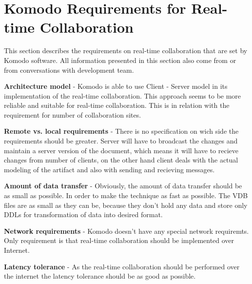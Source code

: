 \documentclass[12pt,oneside]{fithesis2}
\begin{document}
\section{Komodo Requirements for Real-time Collaboration} \label{requirements}
\par This section describes the requirements on real-time collaboration that are set by Komodo software. All information presented in this section also come from \cite{Komodo} or from conversations with development team.

\vspace{3mm} 

\textbf{Architecture model} - Komodo is able to use Client - Server model in its implementation of the real-time collaboration. This approach seems to be more reliable and suitable for real-time collaboration. This is in relation with the requirement for number of collaboration sites.

\vspace{3mm} 

\textbf{Remote vs. local requirements} - There is no specification on wich side the requirements should be greater. Server will have to broadcast the changes and maintain a server version of the document, which means it will have to recieve changes from number of clients, on the other hand client deals with the actual modeling of the artifact and also with sending and recieving messages.

\vspace{3mm} 

\textbf{Amount of data transfer} - Obviously, the amount of data transfer should be as small as possible. In order to make the technique as fast as possible. The VDB files are as small as they can be, because they don't hold any data and store only DDLs for transformation of data into desired format.

\vspace{3mm} 

\textbf{Network requirements} - Komodo doesn't have any special network requiremts. Only requirement is that real-time collaboration should be implemented over Internet.

\vspace{3mm} 

\textbf{Latency tolerance} - As the real-time collaboration should be performed over the internet the latency tolerance should be as good as possible.

\vspace{3mm} 
\end{document}

